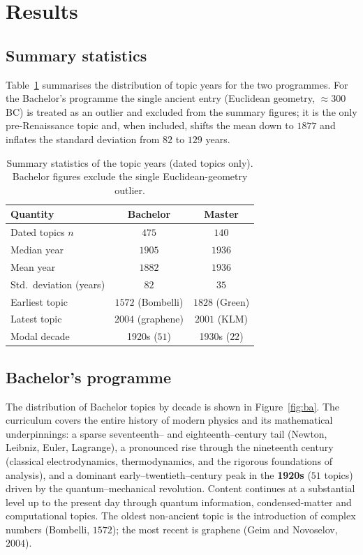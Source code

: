 \documentclass[11pt,a4paper]{article}
\begin{document}
\section{Results}

\subsection{Summary statistics}
Table~\ref{tab:summary} summarises the distribution of topic years for the two
programmes. For the Bachelor's programme the single ancient entry
(Euclidean geometry, $\approx 300$\,BC) is treated as an outlier and excluded
from the summary figures; it is the only pre-Renaissance topic and, when
included, shifts the mean down to $1877$ and inflates the standard deviation
from $82$ to $129$ years.

\begin{table}[h]
\centering
\caption{Summary statistics of the topic years (dated topics only).
Bachelor figures exclude the single Euclidean-geometry outlier.}
\label{tab:summary}
\begin{tabular}{lcc}
\toprule
Quantity & Bachelor & Master \\
\midrule
Dated topics $n$        & $475$              & $140$ \\
Median year             & $1905$             & $1936$ \\
Mean year               & $1882$             & $1936$ \\
Std.\ deviation (years) & $82$               & $35$ \\
Earliest topic          & $1572$ (Bombelli)  & $1828$ (Green) \\
Latest topic            & $2004$ (graphene)  & $2001$ (KLM) \\
Modal decade            & 1920s ($51$)       & 1930s ($22$) \\
\bottomrule
\end{tabular}
\end{table}

\subsection{Bachelor's programme}
The distribution of Bachelor topics by decade is shown in
Figure~\ref{fig:ba}. The curriculum covers the entire history of modern physics
and its mathematical underpinnings: a sparse seventeenth-- and
eighteenth--century tail (Newton, Leibniz, Euler, Lagrange), a pronounced rise
through the nineteenth century (classical electrodynamics, thermodynamics, and
the rigorous foundations of analysis), and a dominant early--twentieth--century
peak in the \textbf{1920s} ($51$ topics) driven by the quantum--mechanical
revolution. Content continues at a substantial level up to the present day
through quantum information, condensed-matter and computational topics.
The oldest non-ancient topic is the introduction of complex numbers
(Bombelli, $1572$); the most recent is graphene (Geim and Novoselov, $2004$).
\end{document}
